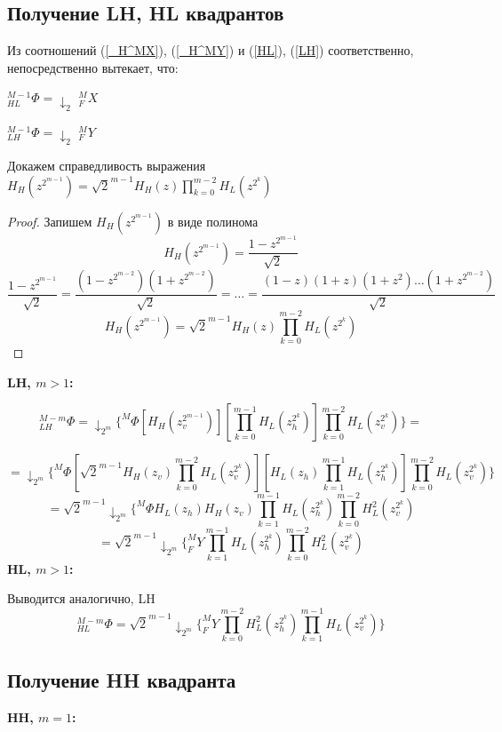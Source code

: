 \documentclass[oneside, final, 14pt]{article}
\begin{document}
\subsection{Получение LH, HL квадрантов}
Из соотношений (\ref{_H^MX}), (\ref{_H^MY}) и (\ref{HL}), (\ref{LH}) соответственно, непосредственно вытекает, что:
\begin{center}

$ 	_{HL}^{M-1}\Phi = \downarrow_{2}$ $ _F^MX $ 

$ 	_{LH}^{M-1}\Phi = \downarrow_{2}$ $ _F^MY $

\end{center}

Докажем справедливость выражения $H_{H}(z^{2^{m-1}}) = \sqrt{2}^{m-1} H_H(z) \prod \limits_{k=0}^{m-2} H_L(z^{2^k})$
\begin{proof}
Запишем $H_{H}(z^{2^{m-1}})$ в виде полинома
$$H_{H}(z^{2^{m-1}}) = \frac{1 - z^{2^{m-1}}}{\sqrt{2}}$$
$$\frac{1 - z^{2^{m-1}}}{\sqrt{2}} = \frac{(1-z^{2^{m-2}})(1+z^{2^{m-2}})}{\sqrt{2}}=\ldots=\frac{(1-z)(1+z)(1+z^2)\ldots(1+z^{2^{m-2}})}{\sqrt{2}}$$
$$H_{H}(z^{2^{m-1}}) = \sqrt{2}^{m-1} H_H(z) \prod \limits_{k=0}^{m-2} H_L(z^{2^k})$$
\end{proof}

\textbf{LH, $m>1$:}

\[
_{LH}^{M-m}\Phi=
\downarrow_{2^m} \{^M\Phi [H_H(z_v^{2^{m-1}})] [\prod\limits_{k = 0}^{m-1} H_L(z_h^{2^k})]
							\prod\limits_{k = 0}^{m-2} H_L(z_v^{2^k})\}=\]
							
\[
=\downarrow_{2^m} \{^M\Phi [\sqrt{2}^{m-1} H_H(z_v) \prod \limits_{k=0}^{m-2} H_L(z_v^{2^k})]
					[H_L(z_h)\prod \limits_{k=1}^{m-1} H_L(z_h^{2^k})]
					\prod\limits_{k = 0}^{m-2} H_L(z_v^{2^k})
\}			
\]
\[
=\sqrt{2}^{m-1} \downarrow_{2^m} \{^M\Phi H_L(z_h) H_H(z_v)\prod \limits_{k=1}^{m-1} H_L(z_h^{2^k})\prod \limits_{k=0}^{m-2} H_L^2(z_v^{2^k})
\]
\[
=\sqrt{2}^{m-1} \downarrow_{2^m} \{_F^MY \prod \limits_{k=1}^{m-1} H_L(z_h^{2^k})\prod \limits_{k=0}^{m-2} H_L^2(z_v^{2^k})
\]
\textbf{HL, $m>1$:}

Выводится аналогично, LH
\[_{HL}^{M-m}\Phi=
\sqrt{2}^{m-1} \downarrow_{2^m} \{_F^MY \prod \limits_{k=0}^{m-2} H_L^{2}(z_h^{2^k})\prod \limits_{k=1}^{m-1} H_L(z_v^{2^k})\}
\]

\subsection{Получение HH квадранта}
\textbf{HH, $m=1$:}\cite{new_method2}
\end{document}
